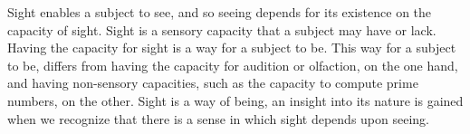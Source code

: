 \documentclass[12pt]{article}
\begin{document}
Sight enables a subject to see, and so seeing depends for its existence on the capacity of sight. Sight is a sensory capacity that a subject may have or lack. Having the capacity for sight is a way for a subject to be. This way for a subject to be, differs from having the capacity for audition or olfaction, on the one hand, and having non-sensory capacities, such as the capacity to compute prime numbers, on the other. Sight is a way of being, an insight into its nature is gained when we recognize that there is a sense in which sight depends upon seeing.


 
 
\end{document}
